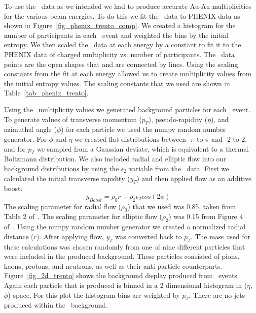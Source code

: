 \documentclass[11pt]{article}
\begin{document}
To use the \trento\ data as we intended we had to produce accurate Au-Au multiplicities for the various beam energies. To do this we fit the \trento\ data to PHENIX data as shown in Figure~\ref{fig_phenix_trento_comp}.  We created a histogram for the number of participants in each \trento\ event and weighted the bins by the initial entropy. We then scaled the \trento\ data at each energy by a constant to fit it to the PHENIX data of charged multiplicity vs. number of participants. The \trento\ data points are the open shapes that and are connected by lines. Using the scaling constants from the fit at each energy allowed us to create multiplicity values from the initial entropy values. The scaling constants that we used are shown in Table~\ref{tab_phenix_trento}.

Using the \trento\ multiplicity values we generated background particles for each \trento\ event. To generate values of transverse momentum ($p_T$), pseudo-rapidity ($\eta$), and azimuthal angle ($\phi$) for each particle we used the numpy random number generator. For $\phi$  and $\eta$ we created flat distributions between -$\pi$ to $\pi$ and -2 to 2, and for $p_T$ we sampled from a Gaussian deviate, which is equivalent to a thermal Boltzmann distribution. We also included radial and elliptic flow into our background distributions by using the $\epsilon_2$ variable from the \trento\ data. First we calculated the initial transverse rapidity ($y_T$) and then applied flow as an additive boost. 
\[y_{Boost} = \rho_0 r+ \rho_2  \epsilon_2  cos(2\phi)\]
The scaling parameter for radial flow ($\rho_0$) that we used was 0.85, taken from Table 2 of~\cite{Retiere:2004hn}.  The scaling parameter for elliptic flow ($\rho_2$) was 0.15 from Figure 4 of~\cite{Alver:2010do}.  Using the numpy random number generator we created a normalized radial distance ($r$). After applying flow, $y_T$ was converted back to $p_T$. The mass used for these calculations was chosen randomly from one of nine different particles that were included in the produced background. These particles consisted of pions, kaons, protons, and neutrons, as well as their anti particle counterparts. Figure~\ref{fig_2d_trento} shows the background display produced from \trento\ events. Again each particle that is produced is binned in a 2 dimensional histogram in ($\eta$,$\phi$) space. For this plot the histogram bins are weighted by $p_T$. There are no jets produced within the \trento\ background.
\end{document}

